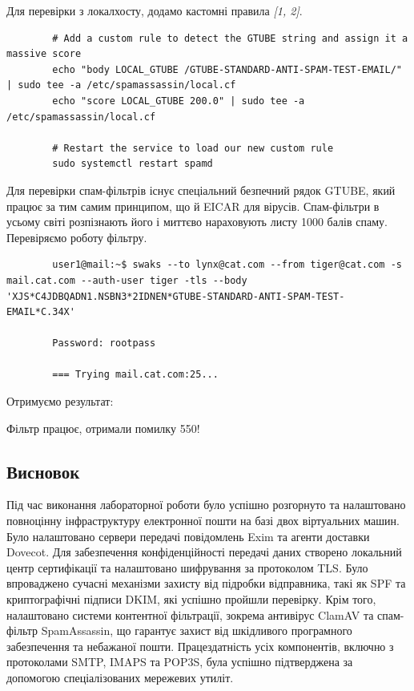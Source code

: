 \documentclass[14pt, a4paper]{extreport}
\begin{document}
	Для перевірки з локалхосту, додамо кастомні правила \textit{[1, 2]}.
	
	\begin{verbatim}
		# Add a custom rule to detect the GTUBE string and assign it a massive score
		echo "body LOCAL_GTUBE /GTUBE-STANDARD-ANTI-SPAM-TEST-EMAIL/" | sudo tee -a /etc/spamassassin/local.cf
		echo "score LOCAL_GTUBE 200.0" | sudo tee -a /etc/spamassassin/local.cf
		
		# Restart the service to load our new custom rule
		sudo systemctl restart spamd
	\end{verbatim}
	
	Для перевірки спам-фільтрів існує спеціальний безпечний рядок GTUBE, який працює за тим самим принципом, що й EICAR для вірусів. Спам-фільтри в усьому світі розпізнають його і миттєво нараховують листу 1000 балів спаму. Перевіряємо роботу фільтру.
	
	\begin{verbatim}
		user1@mail:~$ swaks --to lynx@cat.com --from tiger@cat.com -s mail.cat.com --auth-user tiger -tls --body 'XJS*C4JDBQADN1.NSBN3*2IDNEN*GTUBE-STANDARD-ANTI-SPAM-TEST-EMAIL*C.34X'
		
		Password: rootpass
		
		=== Trying mail.cat.com:25...
	\end{verbatim}
	
	Отримуємо результат:
	
	
	Фільтр працює, отримали помилку 550!
	
	\subsection*{Висновок}
	
	Під час виконання лабораторної роботи було успішно розгорнуто та налаштовано повноцінну інфраструктуру електронної пошти на базі двох віртуальних машин. Було налаштовано сервери передачі повідомлень Exim та агенти доставки Dovecot. Для забезпечення конфіденційності передачі даних створено локальний центр сертифікації та налаштовано шифрування за протоколом TLS. Було впроваджено сучасні механізми захисту від підробки відправника, такі як SPF та криптографічні підписи DKIM, які успішно пройшли перевірку. Крім того, налаштовано системи контентної фільтрації, зокрема антивірус ClamAV та спам-фільтр SpamAssassin, що гарантує захист від шкідливого програмного забезпечення та небажаної пошти. Працездатність усіх компонентів, включно з протоколами SMTP, IMAPS та POP3S, була успішно підтверджена за допомогою спеціалізованих мережевих утиліт.
	
\end{document}
